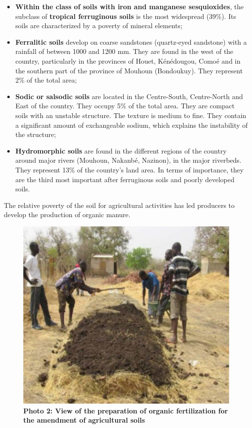 \documentclass[
]{book}
\begin{document}
\begin{itemize}
\item
  \textbf{Within the class of soils with iron and manganese sesquioxides}, the subclass of \textbf{tropical ferruginous soils} is the most widespread (39\%). Its soils are characterized by a poverty of mineral elements;
\item
  \textbf{Ferralitic soils} develop on coarse sandstones (quartz-eyed sandstone) with a rainfall of between 1000 and 1200 mm. They are found in the west of the country, particularly in the provinces of Houet, Kénédougou, Comoé and in the southern part of the province of Mouhoun (Bondoukuy). They represent 2\% of the total area;
\item
  \textbf{Sodic or salsodic soils} are located in the Centre-South, Centre-North and East of the country. They occupy 5\% of the total area. They are compact soils with an unstable structure. The texture is medium to fine. They contain a significant amount of exchangeable sodium, which explains the instability of the structure;
\item
  \textbf{Hydromorphic soils} are found in the different regions of the country around major rivers (Mouhoun, Nakanbé, Nazinon), in the major riverbeds. They represent 13\% of the country's land area. In terms of importance, they are the third most important after ferruginous soils and poorly developed soils.
\end{itemize}

The relative poverty of the soil for agricultural activities has led producers to develop the production of organic manure.

\begin{figure}
\centering
\includegraphics[width=6.73958in,height=\textheight]{Figures and Photos/Photo 2.png}
\caption{\textbf{Photo 2: View of the preparation of organic fertilization for the amendment of agricultural soils}}
\end{figure}
\end{document}
